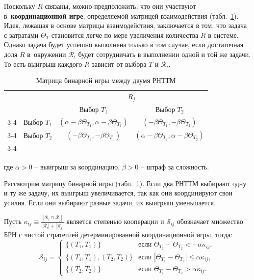 Поскольку $R$ связаны, можно предположить, что они участвуют в~\textbf{координационной игре}, определяемой матрицей взаимодействия (табл.~\cref{tab:binGameTable}). Идея, лежащая в основе матрицы взаимодействия, заключается в том, что задача с затратами $\Theta_T$ становится легче по мере увеличения количества $R$ в системе. Однако задача будет успешно выполнена только в том случае, если достаточная доля $R$ в~окружении $ \mathcal{R}_i$ будет сотрудничать в выполнении одной и той же задачи. То есть выигрыш каждого $R$ зависит от выбора $T$ и $\mathcal{R}_i$.

\begin{table}[htbp]
	\captionsetup[table]{format=split}
	\centering
	\caption{Матрица бинарной игры между двумя РНТТМ}%
	\label{tab:binGameTable}%
	\begin{tabular}{c c|c|c|}
		\multicolumn{2}{c}{} & \multicolumn{2}{c}{$R_j$} \\ %
		\multicolumn{2}{c}{} & \multicolumn{1}{c}{Выбор $T_1$} & \multicolumn{1}{c}{Выбор $T_2$} \\ \cline{3-4}
		\multirow{2}{*}{$R_i$} & Выбор $T_1$ &
		$\displaystyle \left( \alpha - \beta \Theta_{T_1}, \alpha - \beta \Theta_{T_1} \right)$ &
		$\displaystyle \left( -\beta \Theta_{T_1}, -\beta \Theta_{T_2} \right)$ \\ \cline{3-4}
		& Выбор $T_2$ &
		$\displaystyle \left( -\beta \Theta_{T_2}, -\beta \Theta_{T_1} \right)$ &
		$\displaystyle \left( \alpha - \beta \Theta_{T_2}, \alpha - \beta \Theta_{T_2} \right)$ \\ \cline{3-4}
	\end{tabular}
\end{table}

где $\alpha > 0$ -- выигрыш за координацию, $\beta > 0$ -- штраф за сложность.

Рассмотрим матрицу бинарной игры (табл.\ \cref{tab:binGameTable}). Если два РНТТМ выбирают одну и ту же задачу, их выигрыш увеличивается, так как они координируют свои усилия. Если они выбирают разные задачи, их выигрыш уменьшается.

Пусть $\kappa_{ij} \equiv \frac{|\mathcal{R}_i \cap \mathcal{R}_j|}{|\mathcal{R}_i| + |\mathcal{R}_j|}$ является степенью кооперации и $\mathcal{S}_{ij}$ обозначает множество БРН с чистой стратегией детерминированной координационной игры, тогда:
\begin{equation}
	\mathcal{S}_{ij} =
	\begin{cases}
		\{(T_1,T_1)\}                              & \text{если } \Theta_{T_1} - \Theta_{T_2} < -\alpha\kappa_{ij}, \\
		\{(T_1,T_1),(T_2,T_2)\}                   & \text{если } |\Theta_{T_1} - \Theta_{T_2}| \leq \alpha\kappa_{ij}, \\
		\{(T_2,T_2)\}                              & \text{если } \Theta_{T_1} - \Theta_{T_2} > \alpha\kappa_{ij}.
	\end{cases}
	\label{eq:brn_system}
\end{equation}

